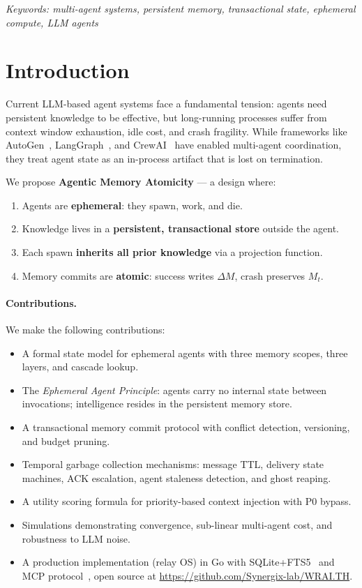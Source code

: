 \documentclass{article}
\begin{document}
\textit{Keywords: multi-agent systems, persistent memory, transactional state, ephemeral compute, LLM agents}

\section{Introduction}

Current LLM-based agent systems face a fundamental tension: agents need persistent knowledge to be effective, but long-running processes suffer from context window exhaustion, idle cost, and crash fragility. While frameworks like AutoGen~\citep{wu2023autogen}, LangGraph~\citep{langgraph2024}, and CrewAI~\citep{crewai2024} have enabled multi-agent coordination, they treat agent state as an in-process artifact that is lost on termination.

We propose \textbf{Agentic Memory Atomicity} --- a design where:

\begin{enumerate}[nosep]
  \item Agents are \textbf{ephemeral}: they spawn, work, and die.
  \item Knowledge lives in a \textbf{persistent, transactional store} outside the agent.
  \item Each spawn \textbf{inherits all prior knowledge} via a projection function.
  \item Memory commits are \textbf{atomic}: success writes $\Delta M$, crash preserves $M_t$.
\end{enumerate}

\paragraph{Contributions.} We make the following contributions:

\begin{itemize}[nosep]
  \item A formal state model for ephemeral agents with three memory scopes, three layers, and cascade lookup.
  \item The \emph{Ephemeral Agent Principle}: agents carry no internal state between invocations; intelligence resides in the persistent memory store.
  \item A transactional memory commit protocol with conflict detection, versioning, and budget pruning.
  \item Temporal garbage collection mechanisms: message TTL, delivery state machines, ACK escalation, agent staleness detection, and ghost reaping.
  \item A utility scoring formula for priority-based context injection with P0 bypass.
  \item Simulations demonstrating convergence, sub-linear multi-agent cost, and robustness to LLM noise.
  \item A production implementation (relay OS) in Go with SQLite+FTS5~\citep{gaffney2022sqlite} and MCP protocol~\citep{mcp2024}, open source at \url{https://github.com/Synergix-lab/WRAI.TH}.
\end{itemize}
\end{document}
